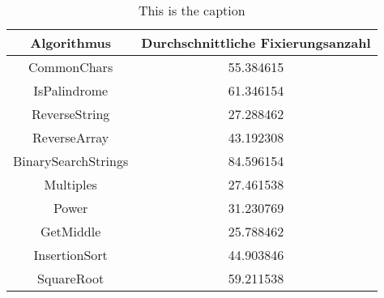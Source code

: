 \begin{table}
\centering
\caption{This is the caption}
\label{tab:table_label}
\begin{tabular}{cc}
\toprule
        Algorithmus &  Durchschnittliche Fixierungsanzahl \\
\midrule
        CommonChars &                           55.384615 \\
       IsPalindrome &                           61.346154 \\
      ReverseString &                           27.288462 \\
       ReverseArray &                           43.192308 \\
BinarySearchStrings &                           84.596154 \\
          Multiples &                           27.461538 \\
              Power &                           31.230769 \\
          GetMiddle &                           25.788462 \\
      InsertionSort &                           44.903846 \\
         SquareRoot &                           59.211538 \\
\bottomrule
\end{tabular}
\end{table}
